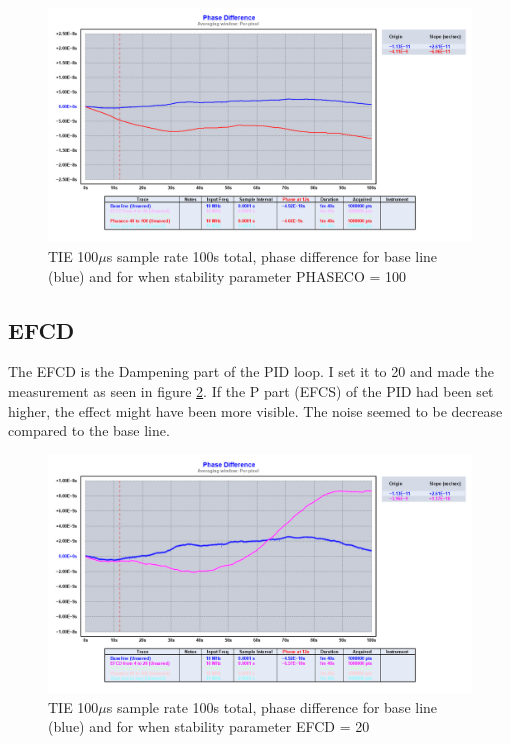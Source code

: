 \documentclass[11pt,english,a4paper]{article}
\begin{document}
\begin{figure}[!htb]
  \centering
    \includegraphics[width=1\textwidth]{PHASE.png}
      \caption{TIE 100$\mu$s sample rate 100s total, phase difference for base line (blue) and for when stability parameter PHASECO = 100}
          \label{fig:PHASE}
\end{figure}

\subsection{EFCD}
The EFCD is the Dampening part of the PID loop. I set it to 20 and made the measurement as seen in figure \ref{fig:EFCD}. If the P part (EFCS) of the PID had been set higher, the effect might have been more visible. The noise seemed to be decrease compared to the base line.

\begin{figure}[!htb]
  \centering
    \includegraphics[width=1\textwidth]{EFCD.png}
      \caption{TIE 100$\mu$s sample rate 100s total, phase difference for base line (blue) and for when stability parameter EFCD = 20}
          \label{fig:EFCD}
\end{figure}
\end{document}
